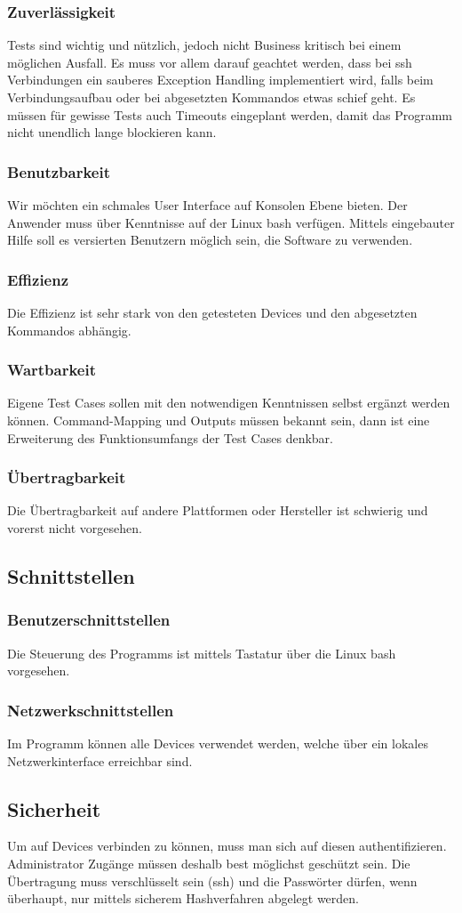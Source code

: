 \subsubsection{Zuverlässigkeit}
Tests sind wichtig und nützlich, jedoch nicht Business kritisch bei einem möglichen Ausfall. Es muss vor allem darauf geachtet werden, dass bei ssh Verbindungen ein sauberes Exception Handling implementiert wird, falls beim Verbindungsaufbau oder bei abgesetzten Kommandos etwas schief geht. Es müssen für gewisse Tests auch Timeouts eingeplant werden, damit das Programm nicht unendlich lange blockieren kann.
\subsubsection{Benutzbarkeit}
Wir möchten ein schmales User Interface auf Konsolen Ebene bieten. Der Anwender muss über Kenntnisse auf der Linux bash verfügen. Mittels eingebauter Hilfe soll es versierten Benutzern möglich sein, die Software zu verwenden.
\subsubsection{Effizienz}
Die Effizienz ist sehr stark von den getesteten Devices und den abgesetzten Kommandos abhängig. 
\subsubsection{Wartbarkeit}
Eigene Test Cases sollen mit den notwendigen Kenntnissen selbst ergänzt werden können. Command-Mapping und Outputs müssen bekannt sein, dann ist eine Erweiterung des Funktionsumfangs der Test Cases denkbar.
\subsubsection{Übertragbarkeit}
Die Übertragbarkeit auf andere Plattformen oder Hersteller ist schwierig und vorerst nicht vorgesehen.

\subsection{Schnittstellen}
\subsubsection{Benutzerschnittstellen}
Die Steuerung des Programms ist mittels Tastatur über die Linux bash vorgesehen.

\subsubsection{Netzwerkschnittstellen}
Im Programm können alle Devices verwendet werden, welche über ein lokales Netzwerkinterface erreichbar sind.

\subsection{Sicherheit}
Um auf Devices verbinden zu können, muss man sich auf diesen authentifizieren. Administrator Zugänge müssen deshalb best möglichst geschützt sein. Die Übertragung muss verschlüsselt sein (ssh) und die Passwörter dürfen, wenn überhaupt, nur mittels sicherem Hashverfahren abgelegt werden.